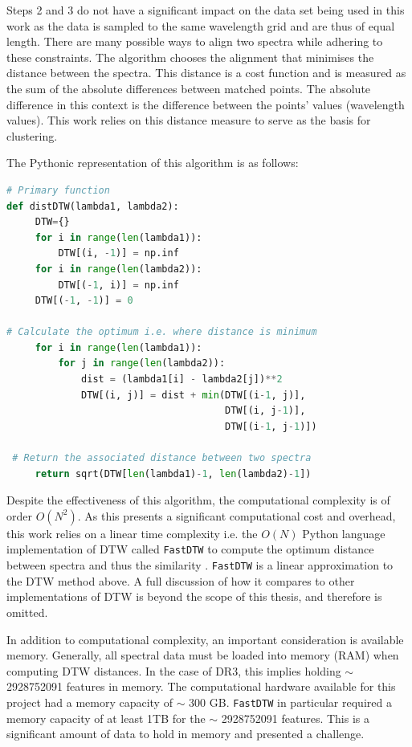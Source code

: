 Steps 2 and 3 do not have a significant impact on the data set being used in this work as the data is sampled to the same wavelength grid and are thus of equal length. 
There are many possible ways to align two spectra while adhering to these constraints. The algorithm chooses the alignment that minimises the distance between the spectra. This distance is a cost function and is measured as the sum of the absolute differences between matched points. The absolute difference in this context is the difference between the points' values (wavelength values). This work relies on this distance measure to serve as the basis for clustering.


The Pythonic representation of this algorithm is as follows:

\begin{lstlisting}[language=Python]
# Primary function
def distDTW(lambda1, lambda2):
     DTW={}
     for i in range(len(lambda1)):
         DTW[(i, -1)] = np.inf
     for i in range(len(lambda2)):
         DTW[(-1, i)] = np.inf
     DTW[(-1, -1)] = 0
 
# Calculate the optimum i.e. where distance is minimum
     for i in range(len(lambda1)):
         for j in range(len(lambda2)):
             dist = (lambda1[i] - lambda2[j])**2
             DTW[(i, j)] = dist + min(DTW[(i-1, j)],
                                      DTW[(i, j-1)], 
                                      DTW[(i-1, j-1)])
 
 # Return the associated distance between two spectra
     return sqrt(DTW[len(lambda1)-1, len(lambda2)-1])
\end{lstlisting}

Despite the effectiveness of this algorithm, the computational complexity is of order $O(N^2)$. As this presents a significant computational cost and overhead, this work relies on a linear time complexity i.e. the $O(N)$ Python language implementation of DTW called \texttt{FastDTW} to compute the optimum distance between spectra and thus the similarity \citep{salvador2007toward}. \texttt{FastDTW} is a linear approximation to the DTW method above. A full discussion of how it compares to other implementations of DTW is beyond the scope of this thesis, and therefore is omitted.

In addition to computational complexity, an important consideration is available memory. Generally, all spectral data must be loaded into memory (RAM) when computing DTW distances. In the case of DR3, this implies holding $\sim$ \num[round-precision=2,round-mode=figures, scientific-notation=true]{2928752091} features in memory. The computational hardware available for this project had a memory capacity of $\sim$ 300 GB. \texttt{FastDTW} in particular required a memory capacity of at least 1TB for the $\sim$ \num[round-precision=2,round-mode=figures, scientific-notation=true]{2928752091} features. This is a significant amount of data to hold in memory and presented a challenge.

